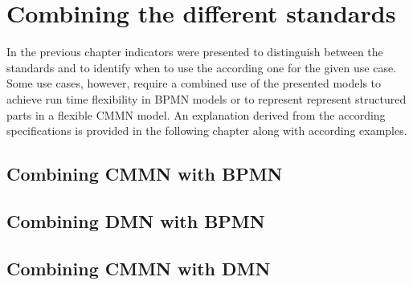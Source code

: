 \chapter{Combining the different standards}
\label{chapter:combination}

In the previous chapter indicators were presented to distinguish between the standards and to identify when to use the according one for the given use case. Some use cases, however, require a combined use of the presented models to achieve run time flexibility in BPMN models or to represent represent structured parts in a flexible CMMN model. An explanation derived from the according specifications is provided in the following chapter along with according examples. 

\section{Combining CMMN with BPMN}

\section{Combining DMN with BPMN}

\section{Combining CMMN with DMN}
